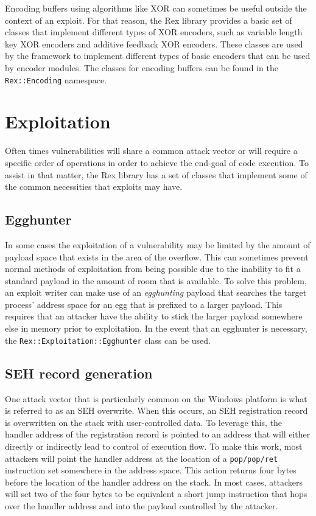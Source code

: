 \documentclass{report}
\begin{document}
\par
Encoding buffers using algorithms like XOR can sometimes be useful
outside the context of an exploit.  For that reason, the Rex library
provides a basic set of classes that implement different types of
XOR encoders, such as variable length key XOR encoders and additive
feedback XOR encoders.  These classes are used by the framework to
implement different types of basic encoders that can be used by
encoder modules.  The classes for encoding buffers can be found in
the \texttt{Rex::Encoding} namespace.

    \section{Exploitation}

\par
Often times vulnerabilities will share a common attack vector or
will require a specific order of operations in order to achieve the
end-goal of code execution.  To assist in that matter, the Rex
library has a set of classes that implement some of the common
necessities that exploits may have.

        \subsection{Egghunter}

\par
In some cases the exploitation of a vulnerability may be limited by
the amount of payload space that exists in the area of the overflow.
This can sometimes prevent normal methods of exploitation from being
possible due to the inability to fit a standard payload in the
amount of room that is available.  To solve this problem, an exploit
writer can make use of an \textit{egghunting} payload that searches
the target process' address space for an egg that is prefixed to a
larger payload.  This requires that an attacker have the ability to
stick the larger payload somewhere else in memory prior to
exploitation.  In the event that an egghunter is necessary, the
\texttt{Rex::Exploitation::Egghunter} class can be used.

        \subsection{SEH record generation}

\par
One attack vector that is particularly common on the Windows
platform is what is referred to as an SEH overwrite.  When this
occurs, an SEH registration record is overwritten on the stack with
user-controlled data.  To leverage this, the handler address of the
registration record is pointed to an address that will either
directly or indirectly lead to control of execution flow.  To make
this work, most attackers will point the handler address at the
location of a \texttt{pop/pop/ret} instruction set somewhere in the
address space. This action returns four bytes before the location of
the handler address on the stack.  In most cases, attackers will set
two of the four bytes to be equivalent a short jump instruction that
hops over the handler address and into the payload controlled by the
attacker.
\end{document}
